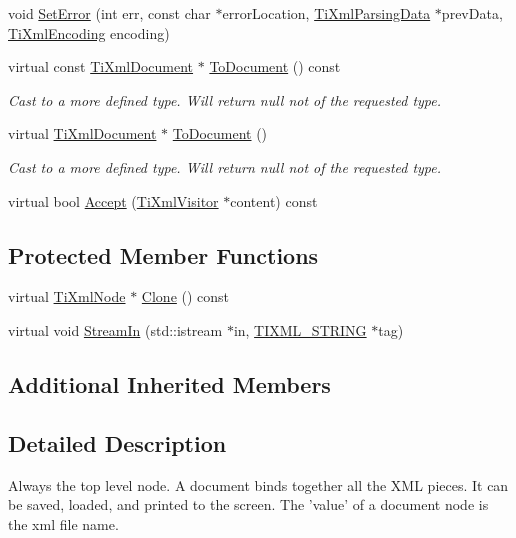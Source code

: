 \begin{DoxyCompactItemize}
void \hyperlink{class_ti_xml_document_a735c23e318597b920c94eae77fa206de}{Set\-Error} (int err, const char $\ast$error\-Location, \hyperlink{class_ti_xml_parsing_data}{Ti\-Xml\-Parsing\-Data} $\ast$prev\-Data, \hyperlink{tinyxml_8h_a88d51847a13ee0f4b4d320d03d2c4d96}{Ti\-Xml\-Encoding} encoding)
\item 
virtual const \hyperlink{class_ti_xml_document}{Ti\-Xml\-Document} $\ast$ \hyperlink{class_ti_xml_document_a1dc977bde3e4fe85a8eb9d88a35ef5a4}{To\-Document} () const 
\begin{DoxyCompactList}\small\item\em Cast to a more defined type. Will return null not of the requested type. \end{DoxyCompactList}\item 
virtual \hyperlink{class_ti_xml_document}{Ti\-Xml\-Document} $\ast$ \hyperlink{class_ti_xml_document_a1025d942a1f328fd742d545e37efdd42}{To\-Document} ()
\begin{DoxyCompactList}\small\item\em Cast to a more defined type. Will return null not of the requested type. \end{DoxyCompactList}\item 
virtual bool \hyperlink{class_ti_xml_document_a3daab2f472418ef66315750202f762ae}{Accept} (\hyperlink{class_ti_xml_visitor}{Ti\-Xml\-Visitor} $\ast$content) const 
\end{DoxyCompactItemize}
\subsection*{Protected Member Functions}
\begin{DoxyCompactItemize}
\item 
virtual \hyperlink{class_ti_xml_node}{Ti\-Xml\-Node} $\ast$ \hyperlink{class_ti_xml_document_ac9e8f09b23454d953b32d1b65cd1409e}{Clone} () const 
\item 
virtual void \hyperlink{class_ti_xml_document_aceaada9ac29206fb660e0449c92b1295}{Stream\-In} (std\-::istream $\ast$in, \hyperlink{tinyxml_8h_a92bada05fd84d9a0c9a5bbe53de26887}{T\-I\-X\-M\-L\-\_\-\-S\-T\-R\-I\-N\-G} $\ast$tag)
\end{DoxyCompactItemize}
\subsection*{Additional Inherited Members}


\subsection{Detailed Description}
Always the top level node. A document binds together all the X\-M\-L pieces. It can be saved, loaded, and printed to the screen. The 'value' of a document node is the xml file name. 

